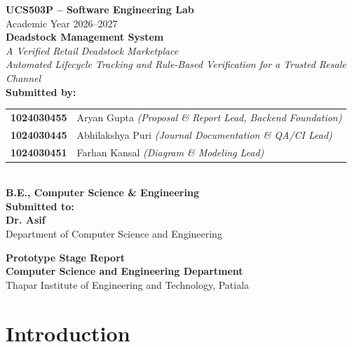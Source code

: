 \documentclass[11pt,a4paper]{report}
\begin{document}
\begin{titlepage}
\centering
\vspace*{1cm}
{\Large\bfseries UCS503P -- Software Engineering Lab}\\[2pt]
{\large Academic Year 2026--2027}\\[24pt]

{\Huge\bfseries Deadstock Management System}\\[8pt]
{\Large\itshape A Verified Retail Deadstock Marketplace}\\[4pt]
{\large\itshape Automated Lifecycle Tracking and Rule-Based Verification for a Trusted Resale Channel}\\[36pt]

{\large\bfseries Submitted by:}\\[10pt]
\begin{tabular}{@{}r l@{}}
\textbf{1024030455} & Aryan Gupta \textit{(Proposal \& Report Lead, Backend Foundation)} \\
\textbf{1024030445} & Abhilakshya Puri \textit{(Journal Documentation \& QA/CI Lead)} \\
\textbf{1024030451} & Farhan Kansal \textit{(Diagram \& Modeling Lead)} \\
\end{tabular}\\[10pt]

{\bfseries B.E., Computer Science \& Engineering}\\[36pt]

{\large\bfseries Submitted to:}\\[6pt]
{\Large\bfseries Dr. Asif}\\
Department of Computer Science and Engineering\\[48pt]

\vfill

{\bfseries Prototype Stage Report}\\
{\bfseries Computer Science and Engineering Department}\\
Thapar Institute of Engineering and Technology, Patiala

\end{titlepage}

\tableofcontents

\chapter{Introduction}
\end{document}
